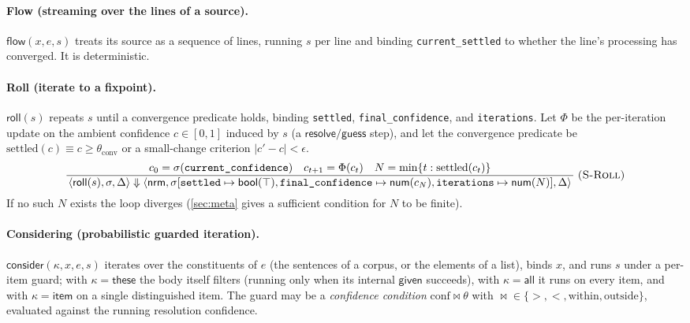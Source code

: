 \documentclass[11pt,a4paper]{article}
\theoremstyle{plain}
\theoremstyle{definition}
\theoremstyle{remark}
\newcommand{\rn}[1]{\textsc{#1}}                          %
\newcommand{\evalto}{\Downarrow}
\newcommand{\env}{\sigma}
\newcommand{\Unit}{[0,1]}
\newcommand{\nrm}{\mathsf{nrm}}
\newcommand{\infrule}[3]{%
  \ensuremath{\displaystyle\frac{\,#2\,}{\,#3\,}}\;\rn{(#1)}}
\begin{document}
\paragraph{Flow (streaming over the lines of a source).}
$\mathsf{flow}(x,e,s)$ treats its source as a sequence of lines, running $s$ per
line and binding \texttt{current\_settled} to whether the line's processing has
converged. It is deterministic.

\paragraph{Roll (iterate to a fixpoint).}
$\mathsf{roll}(s)$ repeats $s$ until a convergence predicate holds, binding
\texttt{settled}, \texttt{final\_confidence}, and \texttt{iterations}. Let
$\Phi$ be the per-iteration update on the ambient confidence
$c\in\Unit$ induced by $s$ (a $\mathsf{resolve}/\mathsf{guess}$ step), and let
the convergence predicate be $\mathrm{settled}(c)\equiv c\ge\theta_{\mathrm{conv}}$
or a small-change criterion $|c'-c|<\epsilon$.
\[
\infrule{S-Roll}{c_0=\env(\texttt{current\_confidence})\quad
                 c_{t+1}=\Phi(c_t)\quad
                 N=\min\{t : \mathrm{settled}(c_t)\}}
                {\langle\mathsf{roll}(s),\env,\Delta\rangle\evalto
                 \langle\nrm,\env[\texttt{settled}\mapsto\mathsf{bool}(\top),
                 \texttt{final\_confidence}\mapsto\mathsf{num}(c_N),
                 \texttt{iterations}\mapsto\mathsf{num}(N)],\Delta\rangle}
\]
If no such $N$ exists the loop diverges (\cref{sec:meta} gives a sufficient
condition for $N$ to be finite).

\paragraph{Considering (probabilistic guarded iteration).}
$\mathsf{consider}(\kappa,x,e,s)$ iterates over the constituents of $e$ (the
sentences of a corpus, or the elements of a list), binds $x$, and runs $s$
under a per-item guard; with $\kappa=\mathsf{these}$ the body itself filters
(running only when its internal $\mathsf{given}$ succeeds), with
$\kappa=\mathsf{all}$ it runs on every item, and with $\kappa=\mathsf{item}$ on
a single distinguished item. The guard may be a \emph{confidence condition}
$\mathrm{conf}\mathbin{\bowtie}\theta$ with
$\bowtie\in\{>,<,\mathrm{within},\mathrm{outside}\}$, evaluated against the
running resolution confidence.

\end{document}
